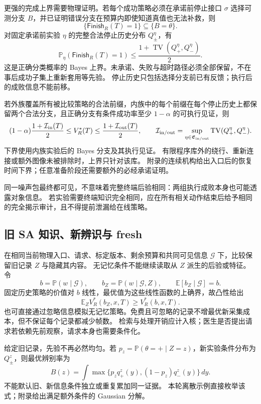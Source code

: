 \documentclass[11pt,a4paper,fontset=fandol]{ctexart}
\theoremstyle{definition}
\theoremstyle{remark}
\numberwithin{equation}{section}
\newcommand{\E}{\mathbb E}
\newcommand{\Pp}{\mathbb P}
\newcommand{\TV}{\operatorname{TV}}
\newcommand{\Finish}{\mathsf{Finish}}
\begin{document}
更强的完成上界需要物理证明。若每个成功策略必须在承诺前停止接口 $\sigma$ 选择可测分支 $B$，并已证明错误分支在预算内即使知道真值也无法补救，则
\[
 \{\Finish_R(T)=1\}\subseteq\{B=\theta\}.
\]
对固定承诺前实验 $\eta$ 的完整合法停止历史分布 $Q_\pm^\eta$，有
\begin{equation}
 \Pp_\eta(\Finish_R(T)=1)\le\frac{1+\TV(Q_+^\eta,Q_-^\eta)}2.
 \label{eq:cut-upper}
\end{equation}
这是正确分类概率的 Bayes 上界。未承诺、失败与超时路径必须全部保留，不在事后成功子集上重新套用等先验。
停止历史只包括选择分支前已有反馈；执行后的成败信息不能前移。

若外族覆盖所有被比较策略的合法前缀，内族中的每个前缀在每个停止历史上都保留两个合法分支，且正确分支有条件成功率至少 $1-\alpha$ 的可执行见证，则
\begin{equation}
 (1-\alpha)\frac{1+\mathcal I_{\rm in}(T)}2
 \le V_R^*(T)\le
 \frac{1+\mathcal I_{\rm out}(T)}2,\qquad
 \mathcal I_{\rm in/out}=\sup_{\eta\in\mathfrak E_{\rm in/out}}\TV(Q_+^\eta,Q_-^\eta).
 \label{eq:physical-bracket}
\end{equation}
下界使用内族实验后的 Bayes 分支及其执行见证。
有限程序库外的绕行、重新连接或额外图像未被排除时，上界只针对该库。
附录的连续机构给出入口后的恢复时间下界；任意准备阶段还需要额外的必经承诺证明。

同一噪声包最终都可见，不意味着完整终端后验相同：两组执行成败本身也可能透露对象信息。
若实验需要终端知识完全相同，应在所有相关动作结束后给予相同的完全揭示审计，且不得提前泄漏给在线策略。

\subsection{旧 SA 知识、新辨识与 fresh}
\label{sec:memory}
在相同当前物理入口、请求、标定版本、剩余预算和共同可见信息 $\mathcal G$ 下，比较保留旧记录 $Z$ 与隐藏其内容。
无记忆条件不能继续读取从 $Z$ 派生的后验或特征。令
\[
 b=\Pp(w\mid\mathcal G),\qquad b_Z=\Pp(w\mid\mathcal G,Z),\qquad
 \E[b_Z\mid\mathcal G]=b .
\]
固定历史策略的价值对 $b$ 线性，最优值为这些线性函数的上确界，故凸性给出
\begin{equation}
 \E_Z V_R^*(b_Z,x,T)\ge V_R^*(b,x,T).
 \label{eq:memory-convex}
\end{equation}
也可直接通过忽略信息模拟无记忆策略。免费且可忽略的记录不增最优新采集成本，但不保证每个记录都减少帧数。
检索与处理开销应计入核；医生是否提出请求若依赖先前观察，请求本身也需要条件化。

给定旧记录，先验不再必然均匀。若 $p_z=\Pp(\theta=+\mid Z=z)$，新实验条件分布为 $Q_\pm^z$，则最优辨别率为
\begin{equation}
 B(z)=\int\max\{p_zq_+^z(y),(1-p_z)q_-^z(y)\}\,dy .
 \label{eq:weighted-bayes}
\end{equation}
不能默认旧、新信息条件独立或重复累加同一证据。
本轮离散示例直接枚举该式；附录给出满足额外条件的 Gaussian 分解。
\end{document}
